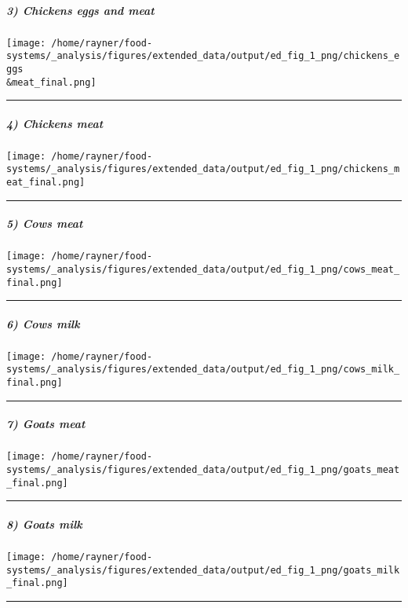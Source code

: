 \documentclass[
]{article}
\begin{document}
\hypertarget{chickens-eggs-and-meat}{%
\subparagraph{3) Chickens eggs and meat}\label{chickens-eggs-and-meat}}

\texttt{[image: /home/rayner/food-systems/\_analysis/figures/extended\_data/output/ed\_fig\_1\_png/chickens\_eggs\\\&meat\_final.png]}

\begin{center}\rule{0.5\linewidth}{0.5pt}\end{center}

\hypertarget{chickens-meat}{%
\subparagraph{4) Chickens meat}\label{chickens-meat}}

\texttt{[image: /home/rayner/food-systems/\_analysis/figures/extended\_data/output/ed\_fig\_1\_png/chickens\_meat\_final.png]}

\begin{center}\rule{0.5\linewidth}{0.5pt}\end{center}

\hypertarget{cows-meat}{%
\subparagraph{5) Cows meat}\label{cows-meat}}

\texttt{[image: /home/rayner/food-systems/\_analysis/figures/extended\_data/output/ed\_fig\_1\_png/cows\_meat\_final.png]}

\begin{center}\rule{0.5\linewidth}{0.5pt}\end{center}

\hypertarget{cows-milk}{%
\subparagraph{6) Cows milk}\label{cows-milk}}

\texttt{[image: /home/rayner/food-systems/\_analysis/figures/extended\_data/output/ed\_fig\_1\_png/cows\_milk\_final.png]}

\begin{center}\rule{0.5\linewidth}{0.5pt}\end{center}

\hypertarget{goats-meat}{%
\subparagraph{7) Goats meat}\label{goats-meat}}

\texttt{[image: /home/rayner/food-systems/\_analysis/figures/extended\_data/output/ed\_fig\_1\_png/goats\_meat\_final.png]}

\begin{center}\rule{0.5\linewidth}{0.5pt}\end{center}

\hypertarget{goats-milk}{%
\subparagraph{8) Goats milk}\label{goats-milk}}

\texttt{[image: /home/rayner/food-systems/\_analysis/figures/extended\_data/output/ed\_fig\_1\_png/goats\_milk\_final.png]}

\begin{center}\rule{0.5\linewidth}{0.5pt}\end{center}
\end{document}
